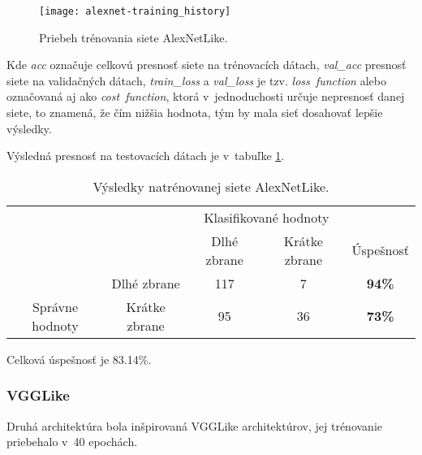 \begin{figure}[H]
	\centering
	\texttt{[image: alexnet-training\_history]}
	\caption{Priebeh trénovania siete AlexNetLike.}
	\label{pic:alexnetlikehistory}
\end{figure}
Kde \textit{acc} označuje celkovú presnosť siete na trénovacích dátach, \textit{val\_acc} presnosť siete na validačných dátach, \textit{train\_loss} a
    \textit{val\_loss} je tzv. \textit{loss\ function} alebo označovaná aj ako \textit{cost\ function}, ktorá v~jednoduchosti určuje nepresnosť danej siete,
    to znamená, že čím nižšia hodnota, tým by mala sieť dosahovať lepšie výsledky.

    Výsledná presnosť na testovacích dátach je v~tabuľke \ref{tab:alexnetresults}.

\begin{table}[H]
    \centering
    \begin{tabular}{ccccc}
                                                                &                                    & \multicolumn{2}{c}{Klasifikované hodnoty}                                                         &                                    \\ \cline{3-5} 
                                                                & \multicolumn{1}{c|}{}              & \multicolumn{1}{c|}{Dlhé zbrane}                & \multicolumn{1}{c|}{Krátke zbrane}              & \multicolumn{1}{c|}{Úspešnosť}     \\ \cline{2-5} 
        \multicolumn{1}{c|}{}                                  & \multicolumn{1}{c|}{Dlhé zbrane}   & \multicolumn{1}{c|}{{\color[HTML]{009901} 117}} & \multicolumn{1}{c|}{{\color[HTML]{9A0000} 7}}  & \multicolumn{1}{c|}{\textbf{94\%}} \\ \cline{2-5} 
        \multicolumn{1}{c|}{\multirow{-2}{*}{Správne hodnoty}} & \multicolumn{1}{c|}{Krátke zbrane} & \multicolumn{1}{c|}{{\color[HTML]{9A0000} 95}}  & \multicolumn{1}{c|}{{\color[HTML]{009901} 36}} & \multicolumn{1}{c|}{\textbf{73\%}} \\ \cline{2-5} 
    \end{tabular}
    \caption{Výsledky natrénovanej siete AlexNetLike.}
    \label{tab:alexnetresults}
\end{table}
Celková úspešnosť je 83.14\%.

\subsubsection{VGGLike}
Druhá architektúra bola inšpirovaná VGGLike architektúrov, jej trénovanie priebehalo v~40 epochách.

